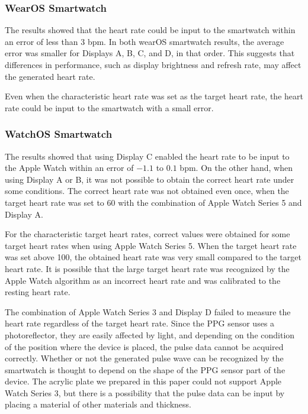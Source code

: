 \documentclass[sigchi,authordraft]{acmart}
\begin{document}
\subsubsection{WearOS Smartwatch}
The results showed that the heart rate could be input to the smartwatch within an error of less than $3$ bpm. In both wearOS smartwatch results, the average error was smaller for Displays A, B, C, and D, in that order. This suggests that differences in performance, such as display brightness and refresh rate, may affect the generated heart rate.\par

Even when the characteristic heart rate was set as the target heart rate, the heart rate could be input to the smartwatch with a small error.

\subsubsection{WatchOS Smartwatch}
The results showed that using Display C enabled the heart rate to be input to the Apple Watch within an error of $-1.1$ to $0.1$ bpm. On the other hand, when using Display A or B, it was not possible to obtain the correct heart rate under some conditions. The correct heart rate was not obtained even once, when the target heart rate was set to 60 with the combination of Apple Watch Series 5 and Display A.\par

For the characteristic target heart rates, correct values were obtained for some target heart rates when using Apple Watch Series 5. When the target heart rate was set above 100, the obtained heart rate was very small compared to the target heart rate. It is possible that the large target heart rate was recognized by the Apple Watch algorithm as an incorrect heart rate and was calibrated to the resting heart rate.\par

The combination of Apple Watch Series 3 and Display D failed to measure the heart rate regardless of the target heart rate. Since the PPG sensor uses a photoreflector, they are easily affected by light, and depending on the condition of the position where the device is placed, the pulse data cannot be acquired correctly. Whether or not the generated pulse wave can be recognized by the smartwatch is thought to depend on the shape of the PPG sensor part of the device. The acrylic plate we prepared in this paper could not support Apple Watch Series 3, but there is a possibility that the pulse data can be input by placing a material of other materials and thickness.
\end{document}

